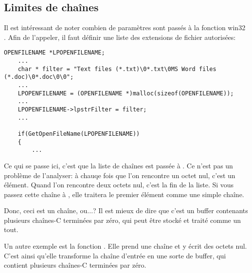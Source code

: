 \subsection{Limites de chaînes}

Il est intéressant de noter combien de paramètres sont passés à la fonction win32
. Afin de l'appeler, il faut définir une liste des extensions
de fichier autorisées:

\begin{lstlisting}[style=customc]
	OPENFILENAME *LPOPENFILENAME;
	...
	char * filter = "Text files (*.txt)\0*.txt\0MS Word files (*.doc)\0*.doc\0\0";
	...
	LPOPENFILENAME = (OPENFILENAME *)malloc(sizeof(OPENFILENAME));
	...
	LPOPENFILENAME->lpstrFilter = filter;
	...

	if(GetOpenFileName(LPOPENFILENAME))
	{
		...
\end{lstlisting}

Ce qui se passe ici, c'est que la liste de chaînes est passée à .
Ce n'est pas un problème de l'analyser: à chauqe fois que l'on rencontre un octet
nul, c'est un élément.
Quand l'on rencontre deux octets nul, c'est la fin de la liste.
Si vous passez cette chaîne à \printf, elle traitera le premier élément comme une
simple chaîne.

Donc, ceci est un chaîne, ou...?
Il est mieux de dire que c'est un buffer contenants plusieurs chaînes-C terminées
par zéro, qui peut être stocké et traité comme un tout.

Un autre exemple est la fonction . Elle prend une chaîne et y écrit
des octets nul.
C'est ainsi qu'elle transforme la chaîne d'entrée en une sorte de buffer, qui contient
plusieurs chaînes-C terminées par zéro.

